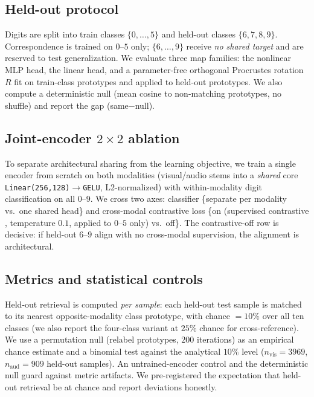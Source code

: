 \documentclass[conference]{IEEEtran}
\begin{document}
\subsection{Held-out protocol}
Digits are split into train classes $\{0,\dots,5\}$ and held-out classes
$\{6,7,8,9\}$. Correspondence is trained on $0$--$5$ only; $\{6,\dots,9\}$
receive \emph{no shared target} and are reserved to test generalization. We
evaluate three map families: the nonlinear MLP head, the linear head, and a
parameter-free orthogonal Procrustes rotation $R$ fit on train-class
prototypes and applied to held-out prototypes. We also compute a
deterministic null (mean cosine to non-matching prototypes, no shuffle) and
report the gap (same$-$null).

\subsection{Joint-encoder $2{\times}2$ ablation}
\label{sec:method:joint}
To separate architectural sharing from the learning objective, we train a
single encoder from scratch on both modalities (visual/audio stems into a
\emph{shared} core \texttt{Linear(256,128)$\to$GELU}, L2-normalized) with
within-modality digit classification on all $0$--$9$. We cross two axes:
classifier \{separate per modality vs.\ one shared head\} and cross-modal
contrastive loss \{on (supervised contrastive \cite{supcon}, temperature
$0.1$, applied to $0$--$5$ only) vs.\ off\}. The contrastive-off row is
decisive: if held-out $6$--$9$ align with no cross-modal supervision, the
alignment is architectural.

\subsection{Metrics and statistical controls}
Held-out retrieval is computed \emph{per sample}: each held-out test sample
is matched to its nearest opposite-modality class prototype, with chance
$=10\%$ over all ten classes (we also report the four-class variant at
$25\%$ chance for cross-reference). We use a permutation null (relabel
prototypes, $200$ iterations) as an empirical chance estimate and a
binomial test against the analytical $10\%$ level ($n_{\mathrm{vis}}{=}3969$,
$n_{\mathrm{aud}}{=}909$ held-out samples). An untrained-encoder control and
the deterministic null guard against metric artifacts. We pre-registered
the expectation that held-out retrieval be at chance and report deviations
honestly.

\end{document}
